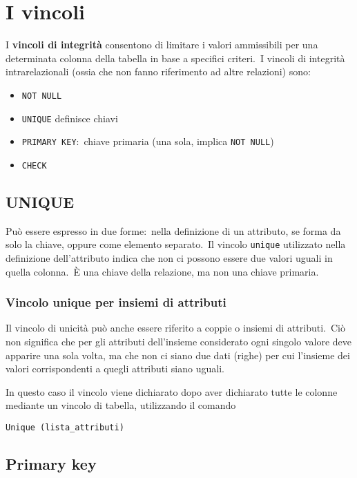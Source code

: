 \section{I vincoli}

I \textbf{vincoli di integrità} consentono di limitare i valori ammissibili per una determinata colonna della tabella in base a specifici criteri.\
I vincoli di integrità intrarelazionali (ossia che non fanno riferimento ad altre relazioni) sono:
\begin{itemize}
	\item \texttt{NOT NULL}
	\item \texttt{UNIQUE} definisce chiavi
	\item \texttt{PRIMARY KEY}:\ chiave primaria (una sola, implica \texttt{NOT NULL})
	\item \texttt{CHECK}
\end{itemize}

\subsection{UNIQUE}

Può essere espresso in due forme:\ nella definizione di un attributo, se forma da solo la chiave, oppure come elemento separato.\
Il vincolo \texttt{unique} utilizzato nella definizione dell'attributo indica che non ci possono essere due valori uguali in quella colonna.\
È una chiave della relazione, ma non una chiave primaria.

\subsubsection{Vincolo unique per insiemi di attributi}

Il vincolo di unicità può anche essere riferito a coppie o insiemi di attributi.\
Ciò non significa che per gli attributi dell'insieme considerato ogni singolo valore deve apparire una sola volta, ma che non ci siano due dati (righe) per cui l'insieme dei valori corrispondenti a quegli attributi siano uguali.\

In questo caso il vincolo viene dichiarato dopo aver  dichiarato tutte le colonne mediante un vincolo di tabella, utilizzando il comando

\begin{center}
	\texttt{Unique (lista\_attributi)}
\end{center}

\subsection{Primary key}

